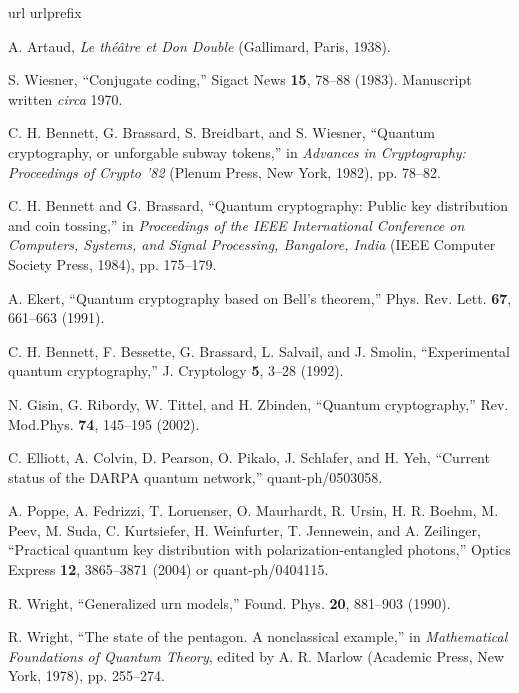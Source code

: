 \documentclass[prb,amssymb,preprint]{revtex4}
\begin{document}
\begin{thebibliography}{10}
\newcommand{\enquote}[1]{``#1''}
\expandafter\ifx\csname url\endcsname\relax
\def\url#1{\texttt{#1}}\fi
\expandafter\ifx\csname urlprefix\endcsname\relax\def\urlprefix{URL }\fi
\providecommand{\eprint}[2][]{\url{#2}}

A. Artaud, \emph{Le th{\'{e}}{\^{a}}tre et Don Double} (Gallimard, Paris,
1938).

 S. Wiesner, ``Conjugate coding,'' Sigact News
\textbf{15}, 78--88 (1983).
Manuscript written {\it circa} 1970.\cite{benn-92}

 C. H. Bennett, G. Brassard, S. Breidbart, and S. Wiesner,
``Quantum
cryptography, or unforgable subway tokens,'' in \emph{Advances in
Cryptography: Proceedings of Crypto '82} (Plenum Press, New York,
1982), pp. 78--82.

C. H. Bennett and G. Brassard, ``Quantum cryptography: Public key
distribution and coin tossing,'' in \emph{Proceedings of the IEEE
International Conference on Computers, Systems, and Signal Processing,
Bangalore, India} (IEEE Computer Society Press, 1984), pp. 175--179.

A. Ekert, ``Quantum cryptography based on Bell's theorem,'' Phys.
Rev. Lett. \textbf{67}, 661--663 (1991).

C. H. Bennett, F. Bessette, G. Brassard, L. Salvail, and J. Smolin,
``Experimental quantum cryptography,'' J. Cryptology
\textbf{5}, 3--28 (1992).

N. Gisin, G. Ribordy, W. Tittel, and H. Zbinden, ``Quantum
cryptography,'' Rev. Mod.Phys. \textbf{74}, 145--195 (2002).

C. Elliott, A. Colvin, D. Pearson, O. Pikalo, J. Schlafer, and H. Yeh,
``Current status of the DARPA quantum network,''
quant-ph/0503058.

A. Poppe, A. Fedrizzi, T. Loruenser, O. Maurhardt, R. Ursin, H. R. Boehm,
M. Peev, M. Suda, C. Kurtsiefer, H. Weinfurter, T. Jennewein, and
A. Zeilinger, ``Practical quantum key distribution with
polarization-entangled photons,'' Optics Express \textbf{12}, 3865--3871
(2004) or quant-ph/0404115.

R. Wright, ``Generalized urn models,'' Found. Phys.
\textbf{20}, 881--903 (1990).

R. Wright, ``The state of the pentagon. A nonclassical example,'' in
\emph{Mathematical Foundations of Quantum Theory}, edited by A. R.
Marlow (Academic Press, New York, 1978), pp.
255--274.


\end{thebibliography}
\end{document}
